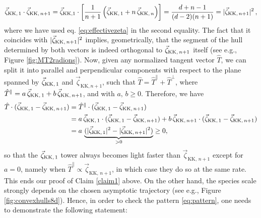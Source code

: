 %
\begin{equation}\label{eq:proofKK1dominant}
	\vec{\zeta}_{\rm KK,\, 1} \cdot \vec{\zeta}_{\text{KK},\, n+1} = \vec{\zeta}_{\rm KK, 1} \cdot \left[\frac{1}{n+1} \left( \vec{\zeta}_{\rm KK,\, 1} + n\, \vec{\zeta}_{{\rm KK,}\, n} \right) \right] = \frac{d+n-1}{(d-2) (n+1)} = |\vec{\zeta}_{{\rm KK},\, n+1}|^2\, ,
\end{equation}
%
where we have used eq. \eqref{eq:effectivezeta} in the second equality. The fact that it coincides with $|\vec{\zeta}_{{\rm KK},\, n+1}|^2$ implies, geometrically, that the segment of the hull determined by both vectors is indeed orthogonal to $\vec{\zeta}_{{\rm KK},\, n+1}$ itself (see e.g., Figure \ref{fig:MT2radions}). Now, given any normalized tangent vector $\hat{T}$, we can split it into parallel and perpendicular components with respect to the plane spanned by $\vec{\zeta}_{\rm KK,\, 1}$ and $\vec{\zeta}_{\text{KK,}\, n+1}$, such that $\hat{T}=\hat{T}^\parallel+\hat{T}^\perp$, where $\hat{T}^{\parallel}=a\,\vec{\zeta}_{\rm KK,\, 1}+b\,\vec{\zeta}_{\text{KK,}\, n+1}$, and with $a,\,b\geq 0$. Therefore, we have
%
\begin{align}
	\hat{T}\cdot(\vec{\zeta}_{\rm KK,\, 1} - \vec{\zeta}_{\text{KK},\, n+1})&=\hat{T}^\parallel\cdot(\vec{\zeta}_{\rm KK,\, 1} - \vec{\zeta}_{{\rm KK},\, n+1})\notag\\
	&=a\, \vec{\zeta}_{\rm KK,\, 1}\cdot(\vec{\zeta}_{\rm KK,\, 1} - \vec{\zeta}_{{\rm KK},\, n+1})+ b\,\vec{\zeta}_{{\rm KK},\, n+1}\cdot(\vec{\zeta}_{\rm KK,\, 1} - \vec{\zeta}_{{\rm KK},\, n+1})\notag\\
	&=a\,\underbrace{(|\vec{\zeta}_{{\rm KK},\, 1}|^2-|\vec{\zeta}_{{\rm KK},\, n+1}|^2)}_{>0}\geq 0,
\end{align}
%
so that the $\vec{\zeta}_{\rm KK,\, 1}$ tower always becomes light faster than $\vec{\zeta}_{\text{KK},\, n+1}$ except for $a=0$, namely when $\hat{T}^{\parallel} \propto \vec{\zeta}_{\text{KK},\, n+1}$, in which case they do so at the same rate. %
This ends our proof of Claim \ref{claim1} above.
On the other hand, the species scale strongly depends on the chosen asymptotic trajectory (see e.g., Figure \ref{fig:convexhulls8d}). Hence, in order to check the pattern \eqref{eq:pattern}, one needs to demonstrate the following statement:
%
